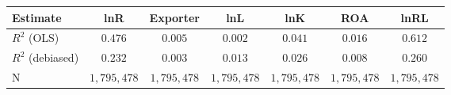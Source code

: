 \begin{tabular}{l*{6}{c}}
\hline\hline
 Estimate & lnR & Exporter & lnL & lnK & ROA & lnRL \\
\hline
\addlinespace $ R^2$ (OLS) & $0.476$ & $0.005$ & $0.002$ & $0.041$ & $0.016$ & $0.612$ \\
$ R^2$ (debiased) & $0.232$ & $0.003$ & $0.013$ & $0.026$ & $0.008$ & $0.260$ \\
N & $1,795,478$ & $1,795,478$ & $1,795,478$ & $1,795,478$ & $1,795,478$ & $1,795,478$ \\
\hline\hline
\end{tabular}
